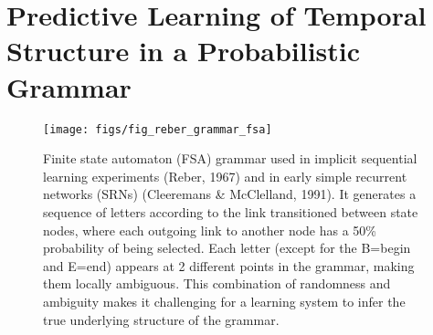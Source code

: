 \documentclass[11pt,twoside]{article}
\newif\myifpdf
\begin{document}
\section{Predictive Learning of Temporal Structure in a Probabilistic Grammar}

\begin{figure}
  \centering\texttt{[image: figs/fig\_reber\_grammar\_fsa]}
  \caption{\footnotesize Finite state automaton (FSA) grammar used in implicit sequential learning experiments (Reber, 1967) and in early simple recurrent networks (SRNs) (Cleeremans \& McClelland, 1991).  It generates a sequence of letters according to the link transitioned between state nodes, where each outgoing link to another node has a 50\% probability of being selected.  Each letter (except for the B=begin and E=end) appears at 2 different points in the grammar, making them locally ambiguous.  This combination of randomness and ambiguity makes it challenging for a learning system to infer the true underlying structure of the grammar.}
  \label{fig.fsa_grammar}
\end{figure}
\end{document}
